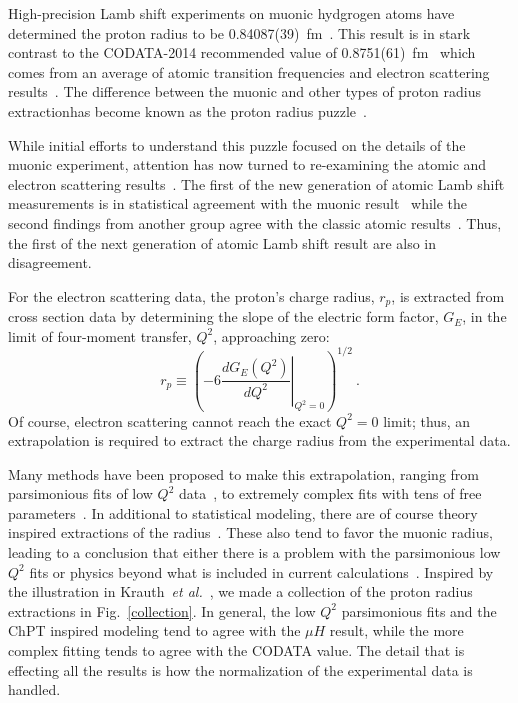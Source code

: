 \documentclass[10pt,aps,prc,twocolumn]{revtex4-1}
\begin{document}
High-precision Lamb shift experiments on muonic hydgrogen atoms have determined the proton radius to 
be 0.84087(39)~fm~\cite{Pohl:2010zza,Antognini:1900ns}.   This result is in stark contrast to the
CODATA-2014 recommended value of 0.8751(61)~fm~\cite{Mohr:2015ccw} which comes from an average of atomic 
transition frequencies and electron scattering results~\cite{Mohr:2012tt,Arrington:2015ria}.    The difference between the muonic and other types of 
proton radius extractionhas become known as the proton radius puzzle~\cite{Pohl:2013yb,Carlson:2015jba,Gao:2015aax,Pohl:2016tqq,Nez:2011zz}.

While initial efforts to understand this puzzle focused on the details of the muonic experiment, attention has
now turned to re-examining the atomic and electron scattering results~\cite{Kelkar:2016tcx}.   The first of the
new generation of atomic Lamb shift measurements is in statistical agreement with the muonic 
result~\cite{Beyer79} while the second findings from another group agree with the classic atomic 
results~\cite{fleurbaey:tel-01633631,Fleurbaey:2018}.   Thus, the first of the next generation of
atomic Lamb shift result are also in disagreement.

For the electron scattering data, the proton's charge radius, $r_p$, is extracted from
cross section data by determining the slope of the electric form factor, $G_E$, in the
limit of four-moment transfer, $Q^2$, approaching zero: 
\begin{equation}
\label{eq:radius}
  r_p \equiv %
    \left( -6  \left. \frac{dG_E(Q^2)}{dQ^2}
    \right|_{Q^{2}=0} \right)^{1/2} \>.
\end{equation}
Of course, electron scattering cannot reach the exact $Q^2 = 0$ limit; thus,
an extrapolation is required to extract the charge radius from the experimental data.

Many methods have been proposed to make this extrapolation,
ranging from parsimonious fits of low $Q^2$ data~\cite{Rosenfelder:1999cd,Griffioen:2015hta,Horbatsch:2015qda,Higinbotham:2015rja},
to extremely complex fits with tens of free parameters~\cite{Bernauer:2010wm,Bernauer:2013tpr,Lee:2015jqa,Graczyk:2014lba,Lorenz:2014vha}.
In additional to statistical modeling, there are of course 
theory inspired extractions of the radius~\cite{Belushkin:2006qa,Horbatsch:2016ilr}.   These also tend to favor the 
muonic radius, leading to a conclusion that either there is a problem with the parsimonious low $Q^2$ fits or physics beyond
what is included in current calculations~\cite{Carlson:2015jba,Liu:2016qwd}.
Inspired by the illustration in Krauth~{\it{et al.}}~\cite{Krauth:2017ijq}, we made a collection
of the proton radius extractions in Fig.~\ref{collection}.    In general, the low $Q^2$ parsimonious fits
and the ChPT inspired modeling tend to agree with the $\mu H$ result, while the more complex fitting
tends to agree with the CODATA value.   The detail that is effecting all the results is how the normalization
of the experimental data is handled.
\end{document}

